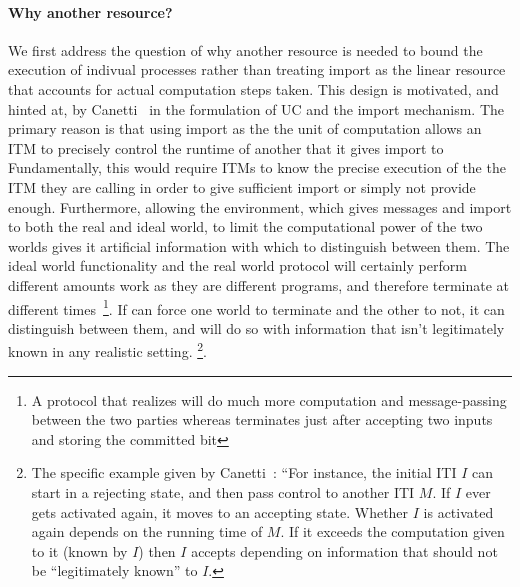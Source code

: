 \paragraph{Why another resource?} 
We first address the question of why another resource is needed to bound the execution of indivual processes rather than treating import as the linear resource that accounts for actual computation steps taken.
This design is motivated, and hinted at, by Canetti~\cite{canettiUC} in the formulation of UC and the import mechanism.
The primary reason is that using import as the the unit of computation allows an ITM to precisely control the runtime of another that it gives import to
Fundamentally, this would require ITMs to know the precise execution of the the ITM they are calling in order to give sufficient import or simply not provide enough.
Furthermore, allowing the environment, which gives messages and import to both the real and ideal world, to limit the computational power of the two worlds gives it artificial information with which to distinguish between them.
The ideal world functionality and the real world protocol will certainly perform different amounts work as they are different programs, and therefore terminate at different times~\footnote{A protocol that realizes \Fcom will do much more computation and message-passing between the two parties whereas \Fcom terminates just after accepting two inputs and storing the committed bit}. 
If \Z can force one world to terminate and the other to not, it can distinguish between them, and will do so with information that isn't legitimately known in any realistic setting. 
\footnote{The specific example given by Canetti~\cite{canettiUC}: ``For instance, the initial ITI $I$ can start in a rejecting state, and then pass control to another ITI $M$. If $I$ ever gets activated again, it moves to an accepting state. Whether $I$ is activated again depends on the running time of $M$. If it exceeds the computation given to it (known by $I$) then $I$ accepts depending on information that should not be ``legitimately known'' to $I$.}.


